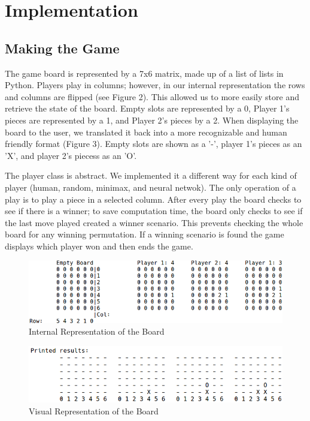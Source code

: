 \documentclass[12pt]{article}
\begin{document}
\section{Implementation}
\subsection{Making the Game}
The game board is represented by a 7x6 matrix, made up of a list of lists in Python. Players play in columns; however, in our internal representation the rows and columns are flipped (see Figure 2). This allowed us to more easily store and retrieve the state of the board.  Empty slots are represented by a 0, Player 1's pieces are represented by a 1, and Player 2's pieces by a 2. When displaying the board to the user, we translated it back into a more recognizable and human friendly format (Figure 3). Empty slots are shown as a '-', player 1's pieces as an 'X', and player 2's piecess as an 'O'.

The player class is abstract. We implemented it a different way for each kind of player (human, random, minimax, and neural netwok). The only operation of a play is to play a piece in a selected column. After every play the board checks to see if there is a winner; to save computation time, the board only checks to see if the last move played created a winner scenario. This prevents checking the whole board for any winning permutation. If a winning scenario is found the game displays which player won and then ends the game.

\begin{figure}[H]
	\centering
	\includegraphics[scale=0.6]{img/rep_board.png}
	\caption{Internal Representation of the Board}
\end{figure}
\begin{figure}[H]
	\centering
	\includegraphics[scale=0.6]{img/print_board.png}
	\caption{Visual Representation of the Board}
\end{figure}
\end{document}
